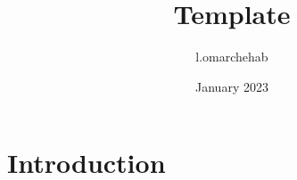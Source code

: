 \documentclass{article}
\title{Template}
\author{l.omarchehab }
\date{January 2023}
\begin{document}
\maketitle

\section{Introduction}
\end{document}
